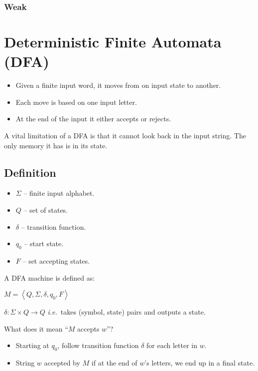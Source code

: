 \documentclass[12pt]{article}
\begin{document}
\subsubsection{ Weak}

\section{Deterministic Finite Automata (DFA)}

\begin{itemize}
    \item Given a finite input word, it moves from on input state to another.
    \item Each move is based on one input letter.
    \item At the end of the input it either accepts or rejects.
\end{itemize}

A vital limitation of a DFA is that it cannot look back in the input string. The
only memory it has is in its state.

\subsection{Definition}

\begin{itemize}
    \item $\Sigma$ -- finite input alphabet.
    \item $Q$ -- set of states.
    \item $\delta$ -- transition function.
    \item $q_0$ -- start state.
    \item $F$ -- set accepting states.
\end{itemize}

A DFA machine is defined as:

$M = \left<Q,\Sigma,\delta,q_0,F\right>$

$\delta: \Sigma \times Q \to Q$ \textit{i.e.}\ takes (symbol, state) pairs and
outputs a state.

What does it mean ``$M$ accepts $w$''?
\begin{itemize}
    \item Starting at $q_0$, follow transition function $\delta$ for each letter
        in $w$.
    \item String $w$ accepted by $M$ if at the end of $w$'s letters, we end up
        in a final state.
\end{itemize}
\end{document}
